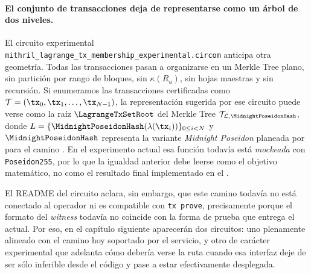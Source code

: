 \paragraph{El conjunto de transacciones deja de representarse como un árbol de dos niveles.}
El circuito experimental \texttt{mithril\_lagrange\_tx\_membership\_experimental}\allowbreak\texttt{.circom} anticipa otra geometría. Todas las transacciones pasan a organizarse en un Merkle Tree plano, sin partición por rango de bloques, sin $\kappa(R_u)$, sin hojas maestras y sin recursión. Si enumeramos las transacciones certificadas como $\mathcal{T} = (\tx_0,\tx_1,\ldots,\tx_{N-1})$, la representación sugerida por ese circuito puede verse como la raíz $\LagrangeTxSetRoot$ del Merkle Tree $\mathcal{T}_{\mathcal{L}, \MidnightPoseidonHash}$, donde $L = \{\MidnightPoseidonHash(\lambda(\tx_i))\}_{0 \leq i < N}$ y $\MidnightPoseidonHash$ representa la variante \textit{Midnight Poseidon} planeada por \Mithril para el camino \FutureSnark. En el experimento actual esa función todavía está \textit{mockeada} con \texttt{Poseidon255}, por lo que la igualdad anterior debe leerse como el objetivo matemático, no como el resultado final implementado en el \zkBridge.

El README del circuito aclara, sin embargo, que este camino todavía no está conectado al operador ni es compatible con \texttt{tx prove}, precisamente porque el formato del \textit{witness} todavía no coincide con la forma de prueba que entrega el \MithrilAggregator actual. Por eso, en el capítulo siguiente aparecerán dos circuitos: uno plenamente alineado con el camino \Pythagoras hoy soportado por el servicio, y otro de carácter experimental que adelanta cómo debería verse la ruta \Lagrange cuando esa interfaz deje de ser sólo inferible desde el código y pase a estar efectivamente desplegada.
